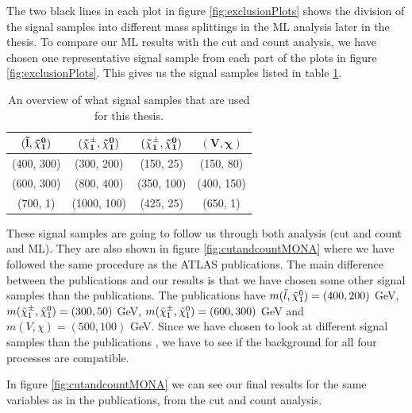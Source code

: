The two black lines in each plot in figure \ref{fig:exclusionPlots} shows the division of the signal samples into different mass splittings in the ML analysis later in the thesis. To compare our ML results with the cut and count analysis, we have chosen one representative signal sample from each part of the plots in figure \ref{fig:exclusionPlots}. This gives us the signal samples listed in table \ref{tab:sigsampcutandcount}.

\begin{table}[H]
    \centering
    \begin{tabular}{c c c c}
    \toprule
    $\mathbf{(\Tilde{l}, \Tilde{\chi}_1^0)}$ & $\mathbf{(\Tilde{\chi}_1^\pm, \Tilde{\chi}_1^0)}$ & $\mathbf{(\Tilde{\chi}_1^\pm, \Tilde{\chi}_1^0)}$ & $\mathbf{( V, \chi)}$  \\
    \midrule
    \midrule
    (400, 300) & (300, 200) & (150, 25) & (150, 80)\\
    (600, 300) & (800, 400) & (350, 100) & (400, 150)\\
    (700, 1) & (1000, 100) & (425, 25) & (650, 1)\\
    \bottomrule
    \end{tabular}
    \caption{An overview of what signal samples that are used for this thesis.}
    \label{tab:sigsampcutandcount}
\end{table}

These signal samples are going to follow us through both analysis (cut and count and ML). They are also shown in figure \ref{fig:cutandcountMONA} where we have followed the same procedure as the ATLAS publications. The main difference between the publications and our results is that we have chosen some other signal samples than the publications. The publications have $m(\Tilde{l}, \Tilde{\chi}_1^0) = (400, 200)$ GeV, $m(\Tilde{\chi}_1^\pm, \Tilde{\chi}_1^0) = (300, 50)$ GeV, $m(\Tilde{\chi}_1^\pm, \Tilde{\chi}_1^0) = (600, 300)$ GeV and $m(V, \chi) = (500,100)$ GeV. Since we have chosen to look at different signal samples than the publications \cite{sleptonexclusion, monoZexclusion}, we have to see if the background for all four processes are compatible. 


In figure \ref{fig:cutandcountMONA} we can see our final results for the same variables as in the publications, from the cut and count analysis.

